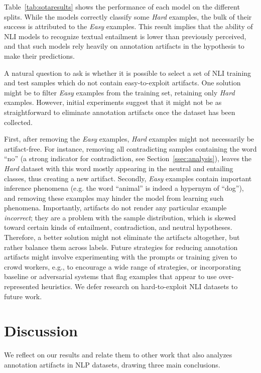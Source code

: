 Table~\ref{tab:sotaresults} shows the performance of each model on the different splits. While the models correctly classify some \textit{Hard} examples, the bulk of their success is attributed to the \textit{Easy} examples. This result implies that the ability of NLI models to recognize textual entailment is lower than previously perceived, and that such models rely heavily on annotation artifacts in the hypothesis to make their predictions.

A natural question to ask is whether it is possible to select a set of NLI training and test samples which do not contain easy-to-exploit artifacts. One  solution might be to filter  \textit{Easy} examples from the training set, retaining only  \textit{Hard} examples. However, initial experiments suggest that it might not be as straightforward to eliminate annotation artifacts once the dataset has been collected.

First, after removing the \textit{Easy} examples, \textit{Hard} examples might not necessarily be artifact-free. For instance, removing all contradicting samples containing the word ``no'' (a strong indicator for contradiction, see Section~\ref{ssec:analysis}), leaves the \textit{Hard} dataset with this word mostly appearing in the neutral and entailing classes, thus creating a new artifact. Secondly, \textit{Easy} examples contain important inference phenomena (e.g. the word ``animal'' is indeed a hypernym of ``dog''), and removing these examples may hinder the model from learning such phenomena. Importantly, artifacts do not render any particular example {\it incorrect}; they are a problem with the sample distribution, which is skewed toward certain kinds of entailment, contradiction, and neutral hypotheses. Therefore, a better solution might not eliminate the artifacts altogether, but rather balance them across labels. Future strategies for reducing annotation artifacts might involve experimenting with the prompts or training given to crowd workers, e.g., to encourage a wide range of strategies, or incorporating baseline or adversarial systems that flag examples that appear to use over-represented heuristics. We defer research on hard-to-exploit NLI datasets to future work. 

\section{Discussion}

We reflect on our results and relate them to other work that also analyzes annotation artifacts in NLP datasets, drawing three main conclusions.

